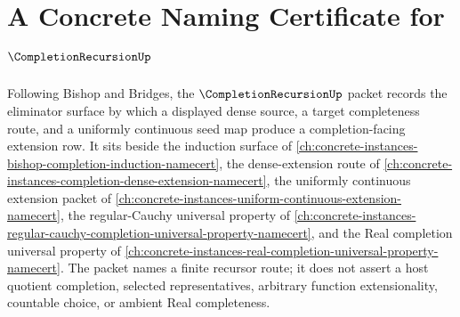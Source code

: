 \chapter{A Concrete Naming Certificate for $\CompletionRecursionUp$}
\label{ch:concrete-instances-completion-recursion-namecert}

Following Bishop and Bridges, the $\CompletionRecursionUp$ packet records the eliminator surface by which a displayed dense source, a target completeness route, and a uniformly continuous seed map produce a completion-facing extension row. It sits beside the induction surface of \autoref{ch:concrete-instances-bishop-completion-induction-namecert}, the dense-extension route of \autoref{ch:concrete-instances-completion-dense-extension-namecert}, the uniformly continuous extension packet of \autoref{ch:concrete-instances-uniform-continuous-extension-namecert}, the regular-Cauchy universal property of \autoref{ch:concrete-instances-regular-cauchy-completion-universal-property-namecert}, and the Real completion universal property of \autoref{ch:concrete-instances-real-completion-universal-property-namecert}. The packet names a finite recursor route; it does not assert a host quotient completion, selected representatives, arbitrary function extensionality, countable choice, or ambient Real completeness.

